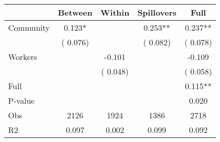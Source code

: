 
\begin{tabular}{l*{4}{c}}\hline&\multicolumn{1}{c}{Between}&\multicolumn{1}{c}{Within}&\multicolumn{1}{c}{Spillovers}&\multicolumn{1}{c}{Full}\\ \hline
 Community             &              0.123*      &                                               &        0.253** &         0.237**                            \\ 
                               &        (       0.076)           &                                       &       (       0.082)     &      (       0.078)                                           \\ 
 Workers       &                                               &       -0.101    &                                &            -0.109                            \\ 
                               &                                               & (       0.048)                  &                                        &      (       0.058)                                           \\ 
\hline                                                                                                                                                                                                                                            
 Full                  &                                               &                                               &                                        &             0.115**                                     \\ 
 P-value               &                                               &                                               &                                        &             0.020                                           \\ 
 Obs                   &               2126               &       1924                       &       1386                &              2718                                               \\ 
 R2                    &                      0.097              &              0.002                      &              0.099               &                     0.092                                              \\ 
\hline \end{tabular}                                                                                                                                                                                                              